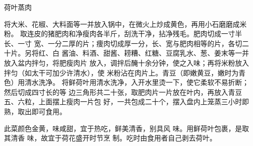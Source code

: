 \begin{recipe}{荷叶蒸肉}

\ingredients


\cooking

\step 将大米、花椒、大料面等一并放入锅中，在微火上炒成黄色，再用小石磨磨成米
粉。
\step 取连皮的猪肥肉和净瘦肉各半斤，刮洗干净，拈净残毛。肥肉切成一寸半长、一寸
宽、一分二厚的片；痩肉切成厚一分，长、宽与肥肉相等的片，各切二十片。另将红、白
酱油、料酒、甜酱、耢糟、红糖、豆腐乳水、葱、姜末等一并放入盆内拌匀，将肥瘦肉片
放入，调拌后醃十余分钟，使之入味；再将米粉放入拌匀（如太干可加少许清水），使
米粉沾在肉片上。青豆（即嫩黄豆，嫩时为青色）用清水洗净。
\step 将鲜荷叶用清水洗净，入开水里烫一下，使它柔软不易折断；然后切成四寸长的等
边三角形共二十张，取肥肉片一片放在叶内，再放入青豆五、六粒，上面摆上瘦肉一片包
好，一共包成二十个，摆入盘内上笼蒸三小时即熟，取出即可食用。

\notes

此菜颜色金黄，味咸甜，宜于热吃，鲜美清香，别具风 味。用鲜荷叶包裹，是取其清香
味，故宜于荷花盛开时节烹 制。吃时由食用者自己剥去荷叶。

\end{recipe}


